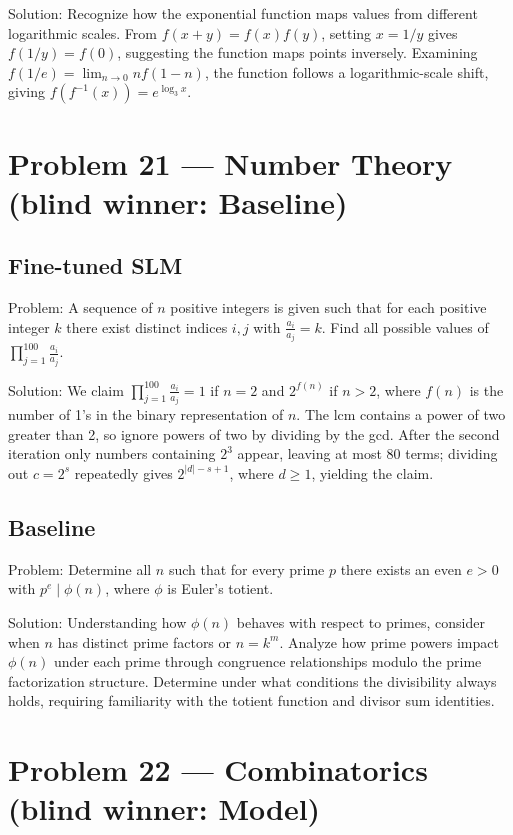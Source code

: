 \documentclass[11pt]{article}
\begin{document}
Solution:
Recognize how the exponential function maps values from different logarithmic scales. From $f(x+y)=f(x)f(y)$, setting $x=1/y$ gives $f(1/y)=f(0)$, suggesting the function maps points inversely. Examining $f(1/e)=\lim_{n\to0} n f(1-n)$, the function follows a logarithmic-scale shift, giving $f(f^{-1}(x)) = e^{\log_3 x}$.

\section*{Problem 21 --- Number Theory \quad(blind winner: Baseline)}

\subsection*{Fine-tuned SLM}

Problem:
A sequence of $n$ positive integers is given such that for each positive integer $k$ there exist distinct indices $i,j$ with $\frac{a_i}{a_j}=k$. Find all possible values of $\prod_{j=1}^{100}\frac{a_i}{a_j}$.

Solution:
We claim $\prod_{j=1}^{100}\frac{a_i}{a_j}=1$ if $n=2$ and $2^{f(n)}$ if $n>2$, where $f(n)$ is the number of 1's in the binary representation of $n$. The lcm contains a power of two greater than 2, so ignore powers of two by dividing by the gcd. After the second iteration only numbers containing $2^3$ appear, leaving at most 80 terms; dividing out $c=2^s$ repeatedly gives $2^{|d|-s+1}$, where $d\ge1$, yielding the claim.

\subsection*{Baseline}

Problem:
Determine all $n$ such that for every prime $p$ there exists an even $e>0$ with $p^e \mid \phi(n)$, where $\phi$ is Euler's totient.

Solution:
Understanding how $\phi(n)$ behaves with respect to primes, consider when $n$ has distinct prime factors or $n=k^m$. Analyze how prime powers impact $\phi(n)$ under each prime through congruence relationships modulo the prime factorization structure. Determine under what conditions the divisibility always holds, requiring familiarity with the totient function and divisor sum identities.

\section*{Problem 22 --- Combinatorics \quad(blind winner: Model)}
\end{document}
